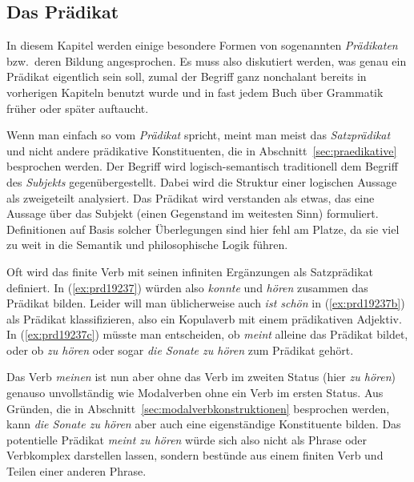 \subsection{Das Prädikat}


In diesem Kapitel werden einige besondere Formen von sogenannten \textit{Prädikaten} bzw.\ deren Bildung angesprochen.
Es muss also diskutiert werden, was genau ein Prädikat eigentlich sein soll, zumal der Begriff ganz nonchalant bereits in vorherigen Kapiteln benutzt wurde und in fast jedem Buch über Grammatik früher oder später auftaucht.


Wenn man einfach so vom \textit{Prädikat} spricht, meint man meist das \textit{Satzprädikat} und nicht andere prädikative Konstituenten, die in Abschnitt~\ref{sec:praedikative} besprochen werden.
Der Begriff wird logisch-semantisch traditionell dem Begriff des \textit{Subjekts} gegenübergestellt.
Dabei wird die Struktur einer logischen Aussage als zweigeteilt analysiert.
Das Prädikat wird verstanden als etwas, das eine Aussage über das Subjekt (einen Gegenstand im weitesten Sinn) formuliert.
Definitionen auf Basis solcher Überlegungen sind hier fehl am Platze, da sie viel zu weit in die Semantik und philosophische Logik führen.

Oft wird das finite Verb mit seinen infiniten Ergänzungen als Satzprädikat definiert.
In (\ref{ex:prd19237}) würden also \textit{konnte} und \textit{hören} zusammen das Prädikat bilden.
Leider will man üblicherweise auch \textit{ist schön} in (\ref{ex:prd19237b}) als Prädikat klassifizieren, also ein Kopulaverb mit einem prädikativen Adjektiv.
In (\ref{ex:prd19237c}) müsste man entscheiden, ob \textit{meint} alleine das Prädikat bildet, oder ob \textit{zu hören} oder sogar \textit{die Sonate zu hören} zum Prädikat gehört.

\begin{exe}
  \ex\label{ex:prd19237} 
  \begin{xlist}
  \end{xlist}
\end{exe}

Das Verb \textit{meinen} ist nun aber ohne das Verb im zweiten Status (hier \textit{zu hören}) genauso unvollständig wie Modalverben ohne ein Verb im ersten Status.
Aus Gründen, die in Abschnitt~\ref{sec:modalverbkonstruktionen} besprochen werden, kann \textit{die Sonate zu hören} aber auch eine eigenständige Konstituente bilden.
Das potentielle Prädikat \textit{meint zu hören} würde sich also nicht als Phrase oder Verbkomplex darstellen lassen, sondern bestünde aus einem finiten Verb und Teilen einer anderen Phrase.


